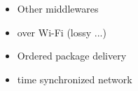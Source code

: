 \chapter{}
\label{sec:conclusion_and_outlook}
\begin{itemize}
    \item Other middlewares
    \item over Wi-Fi (lossy ...)
    \item Ordered package delivery
    \item time synchronized network
\end{itemize}